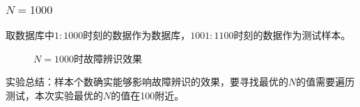 \documentclass[lang=cn,11pt,a4paper]{elegantpaper}
\begin{document}
\subsubsection{$N = 1000$}
取数据库中$1:1000$时刻的数据作为数据库，$1001:1100$时刻的数据作为测试样本。
\begin{figure}[H]
	\centering  %
	\caption{$N=1000$时故障辨识效果}
	\label{Fig.main}
\end{figure}
实验总结：样本个数确实能够影响故障辨识的效果，要寻找最优的$N$的值需要遍历测试，本次实验最优的$N$的值在100附近。
\end{document}
